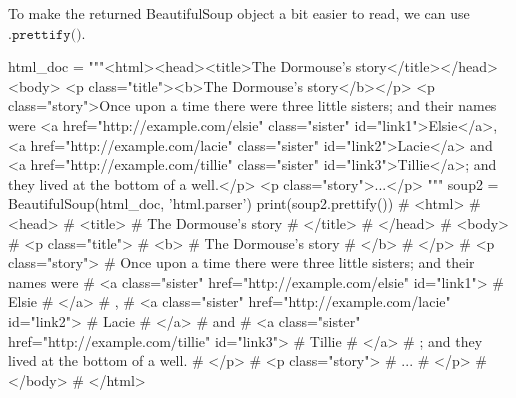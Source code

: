 \documentclass{article}
\begin{document}
  To make the returned BeautifulSoup object a bit easier to read, we can use $\texttt{.prettify()}$. 
  \begin{python}
  html_doc = 
  """<html><head><title>The Dormouse's story</title></head>
  <body>
  <p class="title"><b>The Dormouse's story</b></p>
  <p class="story">Once upon a time there were three little sisters; and their names were
  <a href="http://example.com/elsie" class="sister" id="link1">Elsie</a>,
  <a href="http://example.com/lacie" class="sister" id="link2">Lacie</a> and
  <a href="http://example.com/tillie" class="sister" id="link3">Tillie</a>;
  and they lived at the bottom of a well.</p>
  <p class="story">...</p>
  """
  soup2 = BeautifulSoup(html_doc, 'html.parser')
  print(soup2.prettify())
  # <html>
  #  <head>
  #   <title>
  #    The Dormouse's story
  #   </title>
  #  </head>
  #  <body>
  #   <p class="title">
  #    <b>
  #     The Dormouse's story
  #    </b>
  #   </p>
  #   <p class="story">
  #    Once upon a time there were three little sisters; and their names were
  #    <a class="sister" href="http://example.com/elsie" id="link1">
  #     Elsie
  #    </a>
  #    ,
  #    <a class="sister" href="http://example.com/lacie" id="link2">
  #     Lacie
  #    </a>
  #    and
  #    <a class="sister" href="http://example.com/tillie" id="link3">
  #     Tillie
  #    </a>
  #    ; and they lived at the bottom of a well.
  #   </p>
  #   <p class="story">
  #    ...
  #   </p>
  #  </body>
  # </html>
  \end{python}
\end{document}
